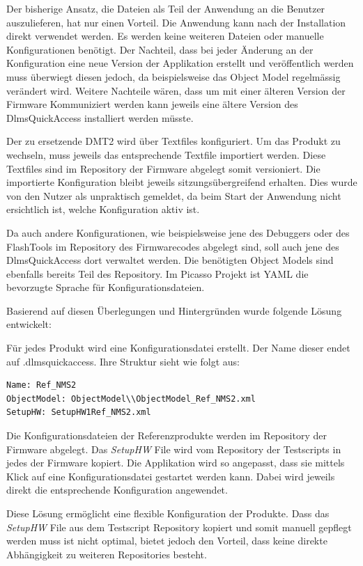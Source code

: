 Der bisherige Ansatz, die Dateien als Teil der Anwendung an die Benutzer auszulieferen, hat nur einen Vorteil.
Die Anwendung kann nach der Installation direkt verwendet werden. Es werden keine weiteren Dateien oder manuelle Konfigurationen benötigt.
Der Nachteil, dass bei jeder Änderung an der Konfiguration eine neue Version der Applikation erstellt und veröffentlich werden muss überwiegt diesen jedoch, da beispielsweise das Object Model regelmässig verändert wird.
Weitere Nachteile wären, dass um mit einer älteren Version der Firmware Kommuniziert werden kann jeweils eine ältere Version des DlmsQuickAccess installiert werden müsste.

Der zu ersetzende \ac{DMT2} wird über Textfiles konfiguriert.
Um das Produkt zu wechseln, muss jeweils das entsprechende Textfile importiert werden.
Diese Textfiles sind im Repository der Firmware abgelegt somit versioniert.
Die importierte Konfiguration bleibt jeweils sitzungsübergreifend erhalten.
Dies wurde von den Nutzer als unpraktisch gemeldet, da beim Start der Anwendung nicht ersichtlich ist, welche Konfiguration aktiv ist.

Da auch andere Konfigurationen, wie beispielsweise jene des Debuggers oder des FlashTools im Repository des Firmwarecodes abgelegt sind, soll auch jene des DlmsQuickAccess dort verwaltet werden.
Die benötigten Object Models sind ebenfalls bereits Teil des Repository.
Im Picasso Projekt ist \ac{YAML} die bevorzugte Sprache für Konfigurationsdateien.

Basierend auf diesen Überlegungen und Hintergründen wurde folgende Lösung entwickelt:

Für jedes Produkt wird eine Konfigurationsdatei erstellt.
Der Name dieser endet auf .dlmsquickaccess.
Ihre Struktur sieht wie folgt aus:
\begin{verbatim}
Name: Ref_NMS2
ObjectModel: ObjectModel\\ObjectModel_Ref_NMS2.xml
SetupHW: SetupHW1Ref_NMS2.xml
\end{verbatim}
Die Konfigurationsdateien der Referenzprodukte werden im Repository der Firmware abgelegt.
Das \textit{SetupHW} File wird vom Repository der Testscripts in jedes der Firmware kopiert.
Die Applikation wird so angepasst, dass sie mittels Klick auf eine Konfigurationsdatei gestartet werden kann.
Dabei wird jeweils direkt die entsprechende Konfiguration angewendet.

Diese Lösung ermöglicht eine flexible Konfiguration der Produkte.
Dass das \textit{SetupHW} File aus dem Testscript Repository kopiert und somit manuell gepflegt werden muss ist nicht optimal, bietet jedoch den Vorteil, dass keine direkte Abhängigkeit zu weiteren Repositories besteht.

